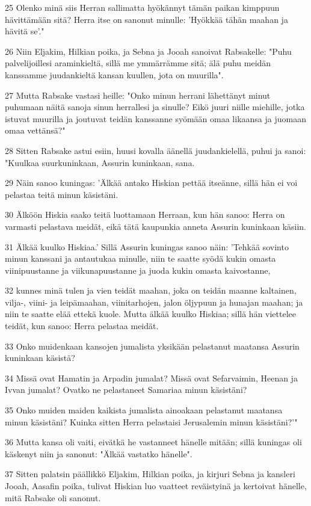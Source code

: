 \par 25 Olenko minä siis Herran sallimatta hyökännyt tämän paikan kimppuun hävittämään sitä? Herra itse on sanonut minulle: 'Hyökkää tähän maahan ja hävitä se'."
\par 26 Niin Eljakim, Hilkian poika, ja Sebna ja Jooah sanoivat Rabsakelle: "Puhu palvelijoillesi araminkieltä, sillä me ymmärrämme sitä; älä puhu meidän kanssamme juudankieltä kansan kuullen, jota on muurilla".
\par 27 Mutta Rabsake vastasi heille: "Onko minun herrani lähettänyt minut puhumaan näitä sanoja sinun herrallesi ja sinulle? Eikö juuri niille miehille, jotka istuvat muurilla ja joutuvat teidän kanssanne syömään omaa likaansa ja juomaan omaa vettänsä?"
\par 28 Sitten Rabsake astui esiin, huusi kovalla äänellä juudankielellä, puhui ja sanoi: "Kuulkaa suurkuninkaan, Assurin kuninkaan, sana.
\par 29 Näin sanoo kuningas: 'Älkää antako Hiskian pettää itseänne, sillä hän ei voi pelastaa teitä minun käsistäni.
\par 30 Älköön Hiskia saako teitä luottamaan Herraan, kun hän sanoo: Herra on varmasti pelastava meidät, eikä tätä kaupunkia anneta Assurin kuninkaan käsiin.
\par 31 Älkää kuulko Hiskiaa.' Sillä Assurin kuningas sanoo näin: 'Tehkää sovinto minun kanssani ja antautukaa minulle, niin te saatte syödä kukin omasta viinipuustanne ja viikunapuustanne ja juoda kukin omasta kaivostanne,
\par 32 kunnes minä tulen ja vien teidät maahan, joka on teidän maanne kaltainen, vilja-, viini- ja leipämaahan, viinitarhojen, jalon öljypuun ja hunajan maahan; ja niin te saatte elää ettekä kuole. Mutta älkää kuulko Hiskiaa; sillä hän viettelee teidät, kun sanoo: Herra pelastaa meidät.
\par 33 Onko muidenkaan kansojen jumalista yksikään pelastanut maatansa Assurin kuninkaan käsistä?
\par 34 Missä ovat Hamatin ja Arpadin jumalat? Missä ovat Sefarvaimin, Heenan ja Ivvan jumalat? Ovatko ne pelastaneet Samariaa minun käsistäni?
\par 35 Onko muiden maiden kaikista jumalista ainoakaan pelastanut maatansa minun käsistäni? Kuinka sitten Herra pelastaisi Jerusalemin minun käsistäni?'"
\par 36 Mutta kansa oli vaiti, eivätkä he vastanneet hänelle mitään; sillä kuningas oli käskenyt niin ja sanonut: "Älkää vastatko hänelle".
\par 37 Sitten palatsin päällikkö Eljakim, Hilkian poika, ja kirjuri Sebna ja kansleri Jooah, Aasafin poika, tulivat Hiskian luo vaatteet reväistyinä ja kertoivat hänelle, mitä Rabsake oli sanonut.

